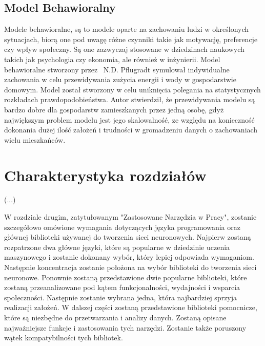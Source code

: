 \documentclass[a4paper,twoside,12pt]{book}
\begin{document}
\subsection{Model Behawioralny}
Modele behawioralne, są to modele oparte na zachowaniu ludzi w określonych sytuacjach, biorą one pod uwagę różne czynniki takie jak motywację, preferencje czy wpływ społeczny. Są one zazwyczaj stosowane w dziedzinach naukowych takich jak psychologia czy ekonomia, ale również w inżynierii. Model behawioralne stworzony przez  N.D. Pflugradt\cite{bib:Behavioural} symulował indywidualne zachowania w celu przewidywania zużycia energii i wody w gospodarstwie domowym. Model został stworzony w celu uniknięcia polegania na statystycznych rozkładach prawdopodobieństwa. Autor stwierdził, że przewidywania modelu są bardzo dobre dla gospodarstw zamieszkanych przez jedną osobę, gdyż największym problem modelu jest jego skalowalność, ze względu na konieczność dokonania dużej ilość założeń i trudności w gromadzeniu danych o zachowaniach wielu mieszkańców.\\


\newpage
\section{Charakterystyka rozdziałów}

 (...)

W rozdziale drugim, zatytułowanym "Zastosowane Narzędzia w Pracy", zostanie szczegółowo omówione wymagania dotyczących języka programowania oraz głównej biblioteki używanej do tworzenia sieci neuronowych. Najpierw zostaną rozpatrzone dwa główne języki, które są popularne w dziedzinie uczenia maszynowego i zostanie dokonany wybór, który lepiej odpowiada wymaganiom. Następnie koncentracja zostanie położona na wybór biblioteki do tworzenia sieci neuronowe. Ponownie zostaną przedstawione dwie popularne biblioteki, które zostaną przeanalizowane pod kątem funkcjonalności, wydajności i wsparcia społeczności. Następnie zostanie wybrana jedna, która najbardziej sprzyja realizacji założeń. W dalszej części zostaną przedstawione biblioteki pomocnicze, które są niezbędne do przetwarzania i analizy danych. Zostaną opisane najważniejsze funkcje i zastosowania tych narzędzi. Zostanie także poruszony wątek kompatybilności tych bibliotek.\\
\end{document}
